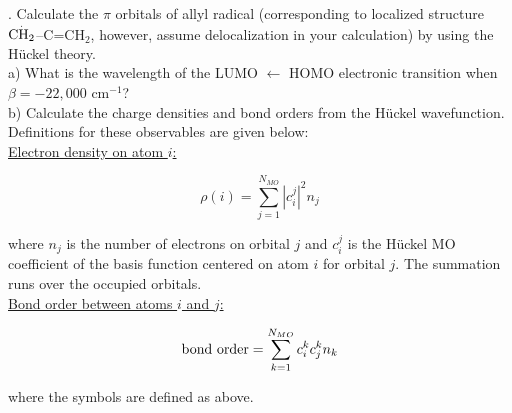 . Calculate the $\pi$ orbitals of allyl radical (corresponding to localized structure 
$\overset{\textnormal{.}}{\textnormal{CH}_2}$--C=CH$_2$, however, assume delocalization in your calculation)
by using the H\"uckel theory.\\
a) What is the wavelength of the LUMO $\leftarrow$ HOMO electronic transition when $\beta = -22,000$ cm$^{-1}$?\\
b) Calculate the charge densities and bond orders from the H\"uckel wavefunction. Definitions for these
observables are given below:\\

\noindent
\underline{Electron density on atom $i$:}

\begin{center}
$$\rho(i) = \sum_{j = 1}^{N_{MO}} |c_i^j|^2n_j$$
\end{center}

\noindent
where $n_j$ is the number of electrons on orbital $j$ and $c_i^j$ is the H\"uckel MO coefficient of the basis
function centered on atom $i$ for orbital $j$. The summation runs over the occupied orbitals.\\

\noindent
\underline{Bond order between atoms $i$ and $j$:}

\begin{center}
$$\textnormal{bond order} = \sum_{k = 1}^{N_{MO}} c_i^k c_j^k n_k$$
\end{center}

\noindent
where the symbols are defined as above.\\


